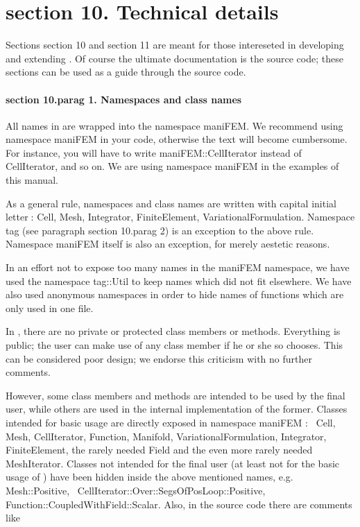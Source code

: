 \section{\numb section 10. Technical details}

Sections \numb section 10 and \numb section 11 are meant for those intereseted in developing and
extending \maniFEM.
Of course the ultimate documentation is the source code; these sections can be used as
a guide through the source code.


\paragraph{\numb section 10.\numb parag 1. Namespaces and class names}

All names in {\maniFEM} are wrapped into the namespace {\codett maniFEM}.
We recommend {\codett using namespace maniFEM} in your code,
otherwise the text will become cumbersome.
For instance, you will have to write {\codett maniFEM::CellIterator} instead of
{\codett CellIterator}, and so on.
We are {\codett using namespace maniFEM} in the examples of this manual.

As a general rule, namespaces and class names are written with capital initial
letter$\;$:
{\codett Cell}, {\codett Mesh}, {\codett Integrator}, {\codett FiniteElement},
{\codett VariationalFormulation}.
Namespace {\codett tag} (see paragraph \numb section 10.\numb parag 2) is an exception
to the above rule.
Namespace {\codett maniFEM} itself is also an exception, for merely aestetic reasons.

In an effort not to expose too many names in the {\codett maniFEM} namespace, we have
used the namespace {\codett tag::Util} to keep names which did not fit elsewhere.
We have also used anonymous namespaces in order to hide names of functions which are
only used in one file.

In \maniFEM, there are no {\codett private} or {\codett protected} class members or methods.
Everything is {\codett public};
the user can make use of any class member if he or she so chooses.
This can be considered poor design; we endorse this criticism with no further comments.

However, some class members and methods are intended to be used by the final user,
while others are used in the internal implementation of the former.
Classes \hbox{intended} for basic usage are directly exposed in {\codett namespace maniFEM} :
\ {\codett Cell}, {\codett Mesh}, {\codett CellIterator}, \hbox{\codett Function},
{\codett Manifold}, {\codett VariationalFormulation}, {\codett Integrator},
{\codett FiniteElement}, the rarely needed {\codett Field} and the even more rarely needed
{\codett MeshIterator}.
Classes not intended for the final user (at least not for the basic usage of \maniFEM)
have been hidden inside the above mentioned names, e.g. {\codett Mesh::Positive},
\ {\codett CellIterator::Over::SegsOfPosLoop::Positive},
\hbox{\codett Function::CoupledWithField::Scalar}.
Also, in the source code there are comments like

